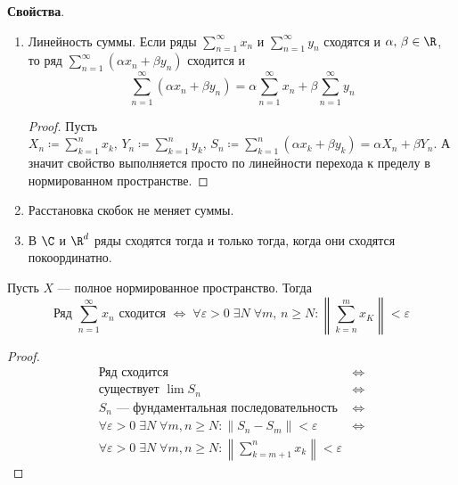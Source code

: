 \textbf{Свойства}.
\begin{enumerate}
  \item Линейность суммы. Если ряды $\sum\limits_{n = 1}^{\infty} x_n$ и $\sum\limits_{n = 1}^{\infty} y_n$ сходятся и $\alpha, \, \beta \in \R$, то ряд $\sum\limits_{n = 1}^{\infty}(\alpha x_n + \beta y_n)$ сходится и
  \begin{equation*}
    \sum\limits_{n = 1}^{\infty} (\alpha x_n + \beta y_n) = \alpha\sum\limits_{n = 1}^{\infty} x_n + \beta\sum\limits_{n = 1}^{\infty} y_n
  \end{equation*}
  \begin{proof}
    Пусть $X_n \coloneqq \sum\limits_{k = 1}^{n} x_k, \, Y_n \coloneqq \sum\limits_{k = 1}^{n} y_k, \, S_n \coloneqq \sum\limits_{k = 1}^{n}(\alpha x_k + \beta y_k) =
    \alpha X_n + \beta Y_n$. А значит свойство выполняется просто по линейности перехода к пределу в нормированном пространстве.
  \end{proof}

  \item Расстановка скобок не меняет суммы.

  \item В $\C$ и $\R^d$ ряды сходятся тогда и только тогда, когда они сходятся покоординатно.
\end{enumerate}

\begin{theorem}
  Пусть $X$ --- полное нормированное пространство. Тогда
  \begin{equation*}
    \text{Ряд }\sum\limits_{n = 1}^{\infty} x_n\text{ сходится }\iff \; \forall \varepsilon > 0 \; \exists N \; \forall m,\, n \geq N\colon
    \left \|\sum\limits_{k = n}^{m} x_K \right \| < \varepsilon
  \end{equation*}
\end{theorem}
\begin{proof}
  \begin{align*}
    \text{Ряд сходится } &\iff \\
    \text{существует }\lim S_n &\iff \\
    S_n\text{ --- фундаментальная последовательность } &\iff \\
    \forall \varepsilon > 0 \; \exists N \; \forall m, n \geq N\colon \|S_n - S_m\| < \varepsilon &\iff \\
    \forall \varepsilon > 0 \; \exists N \; \forall m, n \geq N\colon
    \left\|\sum\limits_{k = m + 1}^{n} x_k\right\| < \varepsilon&
  \end{align*}
\end{proof}

